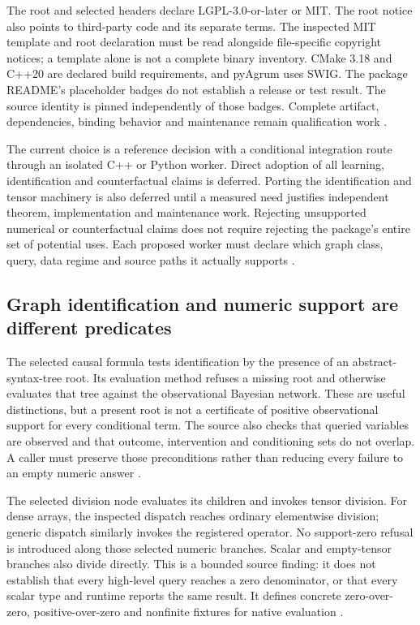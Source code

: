 The root and selected headers declare LGPL-3.0-or-later or MIT. The root
notice also points to third-party code and its separate terms. The inspected
MIT template and root declaration must be read alongside file-specific
copyright notices; a template alone is not a complete binary inventory.
CMake 3.18 and C++20 are declared build requirements, and pyAgrum uses SWIG.
The package README's placeholder badges do not establish a release or test
result. The source identity is pinned independently of those badges.
Complete artifact, dependencies, binding behavior and maintenance remain
qualification work \cite{exec24_agrum_source}.

The current choice is a reference decision with a conditional integration
route through an isolated C++ or Python worker. Direct adoption of all
learning, identification and counterfactual claims is deferred. Porting the
identification and tensor machinery is also deferred until a measured need
justifies independent theorem, implementation and maintenance work.
Rejecting unsupported numerical or counterfactual claims does not require
rejecting the package's entire set of potential uses. Each proposed worker
must declare which graph class, query, data regime and source paths it
actually supports \cite{exec24_agrum_choice}.

\subsection{Graph identification and numeric support are different predicates}
The selected causal formula tests identification by the presence of an
abstract-syntax-tree root. Its evaluation method refuses a missing root and
otherwise evaluates that tree against the observational Bayesian network.
These are useful distinctions, but a present root is not a certificate of
positive observational support for every conditional term. The source also
checks that queried variables are observed and that outcome, intervention
and conditioning sets do not overlap. A caller must preserve those
preconditions rather than reducing every failure to an empty numeric answer
\cite{exec24_agrum_source}.

The selected division node evaluates its children and invokes tensor
division. For dense arrays, the inspected dispatch reaches ordinary
elementwise division; generic dispatch similarly invokes the registered
operator. No support-zero refusal is introduced along those selected
numeric branches. Scalar and empty-tensor branches also divide directly.
This is a bounded source finding: it does not establish that every
high-level query reaches a zero denominator, or that every scalar type and
runtime reports the same result. It defines concrete zero-over-zero,
positive-over-zero and nonfinite fixtures for native evaluation
\cite{exec24_agrum_source,exec24_agrum_choice}.

